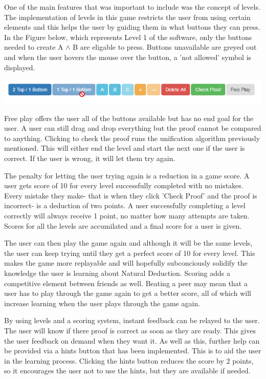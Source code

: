 One of the main features that was important to include was the concept of levels. The implementation of levels in this game restricts the user from using certain elements and this helps the user by guiding them in what buttons they can press. In the Figure below, which represents Level 1 of the software, only the buttons needed to create A $\wedge$ B are eligable to press. Buttons unavailable are greyed out and when the user hovers the mouse over the button, a 'not allowed' symbol is displayed.  

\centerline{\includegraphics[scale=0.65]{buttons}}

Free play offers the user all of the buttons available but has no end goal for the user. A user can still drag and drop everything but the proof cannot be compared to anything. Clicking to check the proof runs the unification algorithm previously mentioned. This will either end the level and start the next one if the user is correct. If the user is wrong, it will let them try again.

The penalty for letting the user trying again is a reduction in a game score. A user gets score of 10 for every level successfully completed with no mistakes. Every mistake they make- that is when they click 'Check Proof' and the proof is incorrect- is a deduction of two points. A user successfully completing a level correctly will always receive 1 point, no matter how many attempts are taken. Scores for all the levels are accumilated and a final score for a user is given.

The user can then play the game again and although it will be the same levels, the user can keep trying until they get a perfect score of 10 for every level. This makes the game more replayable and will hopefully subconciously solidify the knowledge the user is learning about Natural Deduction. Scoring adds a competitive element between friends as well. Beating a peer may mean that a user has to play through the game again to get a better score, all of which will increase learning when the user plays through the game again.

By using levels and a scoring system, instant feedback can be relayed to the user. The user will know if there proof is correct as soon as they are ready. This gives the user feedback on demand when they want it. As well as this, further help can be provided via a hints button that has been implemented. This is to aid the user in the learning process. Clicking the hints button reduces the score by 2 points, so it encourages the user not to use the hints, but they are available if needed.
